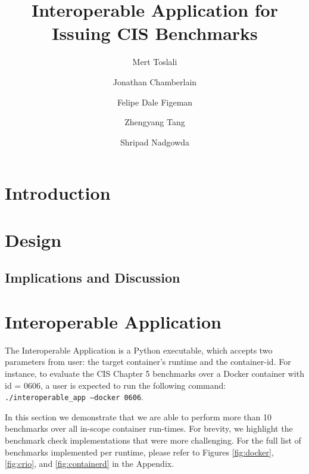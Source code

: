 \documentclass[times, twoside, watermark]{zHenriquesLab-StyleBioRxiv}
\begin{document}
\title{Interoperable Application for Issuing CIS Benchmarks }


\author[1]{Mert Toslali}
\author[1]{Jonathan Chamberlain}
\author[1]{Felipe Dale Figeman}
\author[1]{Zhengyang Tang}
\author[2]{Shripad Nadgowda}


\maketitle

\begin{abstract}

\end {abstract}



\section*{Introduction}
\label{section:introduction}


\section*{Design}


\subsection*{Implications and Discussion}





\section*{Interoperable Application}

The Interoperable Application is a Python executable, which accepts two parameters from user: the target container's runtime and the container-id. For instance, to evaluate the CIS Chapter 5 benchmarks over a Docker container with id = 0606, a user is expected to run the following command:
\texttt{./interoperable\_app --docker 0606}.

In this section we demonstrate that we are able to perform more than 10 benchmarks over all in-scope container run-times. For brevity, we highlight the benchmark check implementations that were more challenging. For the full list of benchmarks implemented per runtime, please refer to Figures \ref{fig:docker}, \ref{fig:crio}, and \ref{fig:containerd} in the Appendix.



\end{document}

